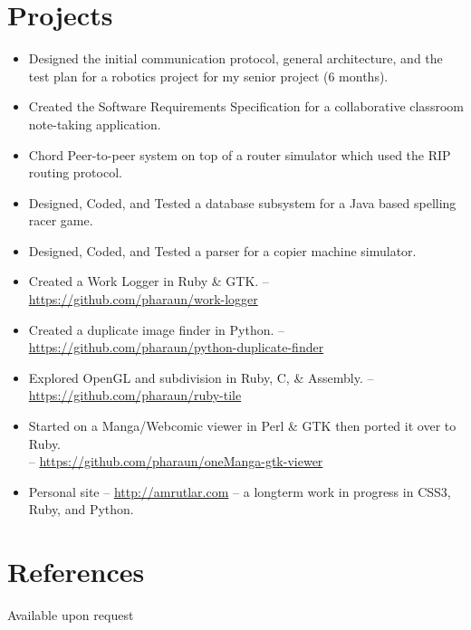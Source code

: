 \documentclass[letterpaper, paper=letter, pagesize, oneside, final]{scrartcl}
\begin{document}
\begin{center}
\section{Projects}

\vskip 2pt
\begin{itemize}[style=sameline,
                    itemsep=1pt,
                    parsep=0pt,
                    topsep=0pt,
                    partopsep=0pt,
                    labelindent=2cm,
                    rightmargin=5mm]
    \item Designed the initial communication protocol, general architecture, and the test plan for a robotics project for my senior project (6 months).
    \item Created the Software Requirements Specification for a collaborative classroom note-taking application.
    \item Chord Peer-to-peer system on top of a router simulator which used the RIP routing protocol.
    \item Designed, Coded, and Tested a database subsystem for a Java based spelling racer game.
    \item Designed, Coded, and Tested a parser for a copier machine simulator.
    \item Created a Work Logger in Ruby \& GTK. -- \url{https://github.com/pharaun/work-logger}
    \item Created a duplicate image finder in Python. -- \url{https://github.com/pharaun/python-duplicate-finder}
    \item Explored OpenGL and subdivision in Ruby, C, \& Assembly. -- \url{https://github.com/pharaun/ruby-tile}
    \item Started on a Manga/Webcomic viewer in Perl \& GTK then ported it over to Ruby. \\ -- \url{https://github.com/pharaun/oneManga-gtk-viewer}
    \item Personal site -- \url{http://amrutlar.com} -- a longterm work in progress in CSS3, Ruby, and Python.
\end{itemize}
\section{References}

\parbox{0.945\linewidth}{Available upon request}
\end{center}
\end{document}
